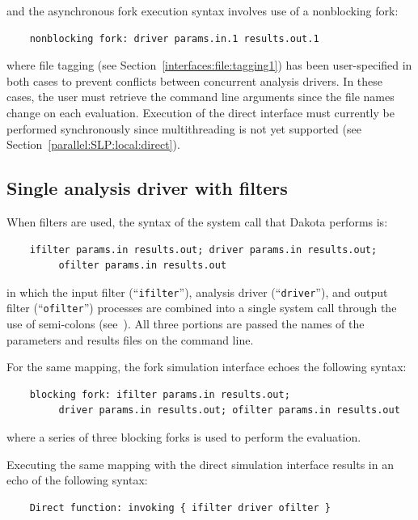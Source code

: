 and the asynchronous fork execution syntax involves use of a
nonblocking fork:
\begin{small}
\begin{verbatim}
    nonblocking fork: driver params.in.1 results.out.1
\end{verbatim}
\end{small}

where file tagging (see Section~\ref{interfaces:file:tagging1}) has
been user-specified in both cases to prevent conflicts between
concurrent analysis drivers. In these cases, the user must retrieve
the command line arguments since the file names change on each
evaluation.  Execution of the direct interface must currently be
performed synchronously since multithreading is not yet supported
(see Section~\ref{parallel:SLP:local:direct}).

\subsection{Single analysis driver with filters}\label{interfaces:components:single2}

When filters are used, the syntax of the system call that Dakota
performs is:
\begin{small}
\begin{verbatim}
    ifilter params.in results.out; driver params.in results.out;
         ofilter params.in results.out
\end{verbatim}
\end{small}

in which the input filter (``\texttt{ifilter}''), analysis driver
(``\texttt{driver}''), and output filter (``\texttt{ofilter}'')
processes are combined into a single system call through the use of
semi-colons (see~\cite{And86}). All three portions are
passed the names of the parameters and results files on the command
line.

For the same mapping, the fork simulation interface echoes the
following syntax:
\begin{small}
\begin{verbatim}
    blocking fork: ifilter params.in results.out;
         driver params.in results.out; ofilter params.in results.out
\end{verbatim}
\end{small}

where a series of three blocking forks is used to perform the
evaluation.

Executing the same mapping with the direct simulation interface
results in an echo of the following syntax:
\begin{small}
\begin{verbatim}
    Direct function: invoking { ifilter driver ofilter }
\end{verbatim}
\end{small}


